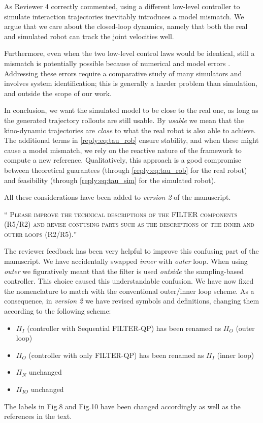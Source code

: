 \documentclass[10pt]{article}
\newcommand{\referee}[1]{\;
  \begin{minipage}[t]{.95\textwidth}
    ``{\small\color{red} \textsc{#1}}''
  \end{minipage}\medskip
  }
\newcommand{\version}[1]{\textit{version #1}}
\begin{document}
\begin{enumerate}[label={[E:\,\arabic{enumi}]}]
As Reviewer 4 correctly commented, using a different low-level controller to simulate interaction trajectories inevitably introduces a model mismatch. We argue that we care about the closed-loop dynamics, namely that both the real and simulated robot can track the joint velocities well.

Furthermore, even when the two low-level control laws would be identical, still a mismatch is potentially possible because of numerical and model errors \cite{erez2015simulation}. Addressing these errors require a comparative study of many simulators and involves system identification; this is generally a harder problem than simulation, and outside the scope of our work. 

In conclusion, we want the simulated model to be close to the real one, as long as the generated trajectory rollouts are still usable. By \emph{usable} we mean that the kino-dynamic trajectories are \emph{close} to what the real robot is also able to achieve. The additional terms in \eqref{reply:eq:tau_rob} ensure stability, and when these might cause a model mismatch, we rely on the reactive nature of the framework to compute a new reference. Qualitatively, this approach is a good compromise between theoretical guarantees (through \eqref{reply:eq:tau_rob} for the real robot) and feasibility (through \eqref{reply:eq:tau_sim} for the simulated robot).

All these considerations have been added to \version{2} of the manuscript. 

\item\label{reply:E1:6} \label{reply:ext:inner_outer}
\referee{Please improve the technical descriptions of the FILTER components (R5/R2) and revise confusing parts such as the descriptions of the inner and outer loops (R2/R5).}

The reviewer feedback has been very helpful to improve this confusing part of the manuscript. We have accidentally swapped \emph{inner} with \emph{outer} loop. When using \emph{outer} we figuratively meant that the filter is used \emph{outside} the sampling-based controller. This choice caused this understandable confusion. We have now fixed the nomenclature to match with the conventional outer/inner loop scheme. As a consequence, in \version{2} we have revised symbols and definitions, changing them according to the following scheme:
\begin{itemize}
    \item $\Pi_I$ (controller with Sequential FILTER-QP) has been renamed as $\Pi_O$ (outer loop)
    \item $\Pi_O$ (controller with only FILTER-QP) has been renamed as $\Pi_I$ (inner loop)
    \item $\Pi_{N}$ unchanged
    \item $\Pi_{IO}$ unchanged
\end{itemize}
The labels in Fig.8 and Fig.10 have been changed accordingly as well as the references in the text.


\end{enumerate}
\end{document}
